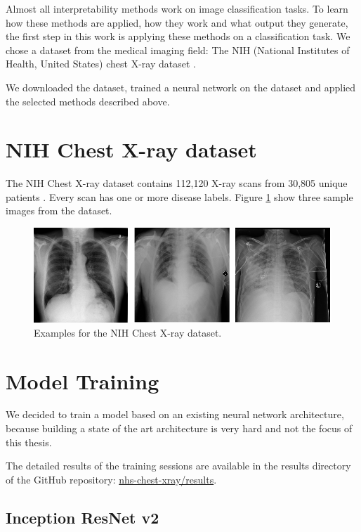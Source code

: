 Almost all interpretability methods work on image classification tasks. To learn how these methods are applied, how they work and what output they generate, the first step in this work is applying these methods on a classification task. We chose a dataset from the medical imaging field: The NIH (National Institutes of Health, United States) chest X-ray dataset \cite{wang2017chestx}.

We downloaded the dataset, trained a neural network on the dataset and applied the selected methods described above.

\section{NIH Chest X-ray dataset}
The NIH Chest X-ray dataset contains 112,120 X-ray scans from 30,805 unique patients \cite{nihchestxraykaggle}. Every scan has one or more disease labels. Figure \ref{chest_xray_sample} show three sample images from the dataset.

\begin{figure}[h]
\centering
\includegraphics[width=14cm]{chapters/03_classification/images/chest-x-ray.png}
\caption{Examples for the NIH Chest X-ray dataset.}
\label{chest_xray_sample}
\end{figure}

\section{Model Training}
We decided to train a model based on an existing neural network architecture, because building a state of the art architecture is very hard and not the focus of this thesis.

The detailed results of the training sessions are available in the results directory of the GitHub repository: \href{https://github.com/andef4/thesis-code/tree/master/nhs-chest-xray/results/}{nhs-chest-xray/results}.

\subsection{Inception ResNet v2}

